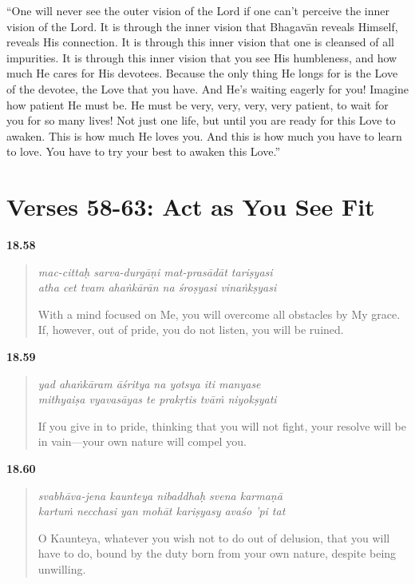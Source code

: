 \enquote{One will never see the outer vision of the Lord if one can’t perceive the inner vision of the Lord. It is through the inner vision that Bhagavān reveals Himself, reveals His connection. It is through this inner vision that one is cleansed of all impurities. It is through this inner vision that you see His humbleness, and how much He cares for His devotees. Because the only thing He longs for is the Love of the devotee, the Love that you have. And He’s waiting eagerly for you! Imagine how patient He must be. He must be very, very, very, very patient, to wait for you for so many lives! Not just one life, but until you are ready for this Love to awaken. This is how much He loves you. And this is how much you have to learn to love. You have to try your best to awaken this Love.}

\section{Verses 58-63: Act as You See Fit}\label{sec-verses-58-63-act-as-you-see-fit}


\par\noindent\textbf{18.58}\par
\begin{verse}
\textit{mac-cittaḥ sarva-durgāṇi mat-prasādāt tariṣyasi} \\
\textit{atha cet tvam ahaṅkārān na śroṣyasi vinaṅkṣyasi}

\noindent With a mind focused on Me, you will overcome all obstacles by My grace. If, however, out of pride, you do not listen, you will be ruined.
\end{verse}
\par



\par\noindent\textbf{18.59}\par
\begin{verse}
\textit{yad ahaṅkāram āśritya na yotsya iti manyase} \\
\textit{mithyaiṣa vyavasāyas te prakṛtis tvāṁ niyokṣyati}

\noindent If you give in to pride, thinking that you will not fight, your resolve will be in vain---your own nature will compel you.
\end{verse}
\par



\par\noindent\textbf{18.60}\par
\begin{verse}
\textit{svabhāva-jena kaunteya nibaddhaḥ svena karmaṇā} \\
\textit{kartuṁ necchasi yan mohāt kariṣyasy avaśo ’pi tat}

\noindent O Kaunteya, whatever you wish not to do out of delusion, that you will have to do, bound by the duty born from your own nature, despite being unwilling.
\end{verse}
\par



